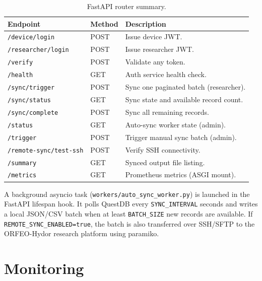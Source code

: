 \begin{table}[H]
  \centering
  \caption{FastAPI router summary.}
  \label{tab:api}
  \begin{tabularx}{\textwidth}{llX}
    \toprule
    \textbf{Endpoint} & \textbf{Method} & \textbf{Description} \\
    \midrule
    \texttt{/device/login}      & POST & Issue device JWT. \\
    \texttt{/researcher/login}  & POST & Issue researcher JWT. \\
    \texttt{/verify}            & POST & Validate any token. \\
    \texttt{/health}            & GET  & Auth service health check. \\
    \midrule
    \texttt{/sync/trigger}      & POST & Sync one paginated batch (researcher). \\
    \texttt{/sync/status}       & GET  & Sync state and available record count. \\
    \texttt{/sync/complete}     & POST & Sync all remaining records. \\
    \midrule
    \texttt{/status}            & GET  & Auto-sync worker state (admin). \\
    \texttt{/trigger}           & POST & Trigger manual sync batch (admin). \\
    \texttt{/remote-sync/test-ssh} & POST & Verify SSH connectivity. \\
    \texttt{/summary}           & GET  & Synced output file listing. \\
    \texttt{/metrics}           & GET  & Prometheus metrics (ASGI mount). \\
    \bottomrule
  \end{tabularx}
\end{table}

A background asyncio task (\texttt{workers/auto\_sync\_worker.py}) is
launched in the FastAPI lifespan hook.
It polls QuestDB every \texttt{SYNC\_INTERVAL} seconds and writes a local
JSON/CSV batch when at least \texttt{BATCH\_SIZE} new records are available.
If \texttt{REMOTE\_SYNC\_ENABLED=true}, the batch is also transferred over
SSH/SFTP to the ORFEO-Hydor research platform using paramiko.

\section{Monitoring}
\label{sec:monitoring}

